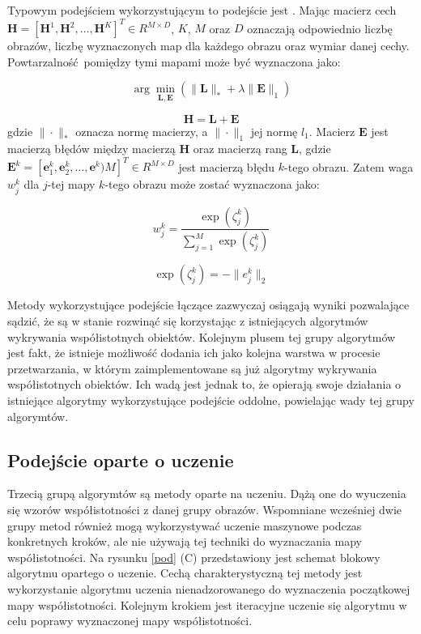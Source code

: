 \documentclass[a4paper,12pt,twoside,openany]{report}
\begin{document}
	Typowym podejściem wykorzystującym to podejście jest \cite{midfeatex}. Mając macierz cech $\mathbf{H} = [\mathbf{H}^1, \mathbf{H}^2, \dots, \mathbf{H}^K]^T \in R^{M \times D}$, $K$, $M$ oraz $D$ oznaczają odpowiednio liczbę obrazów, liczbę wyznaczonych map dla każdego obrazu oraz wymiar danej cechy. Powtarzalność pomiędzy tymi mapami może być wyznaczona jako:

	\begin{equation}
		\arg\min_{\mathbf{L}, \mathbf{E}} \left(\|\mathbf{L}\|_* + \lambda\|\mathbf{E}\|_1\right)
	\end{equation}

	\begin{equation}
	\mathbf{H} = \mathbf{L} + \mathbf{E}
	\end{equation}
	gdzie $\|\cdot\|_*$ oznacza normę macierzy, a $\|\cdot\|_1$ jej normę $l_1$. Macierz $\mathbf{E}$ jest macierzą błędów między macierzą $\mathbf{H}$ oraz macierzą rang $\mathbf{L}$, gdzie $\mathbf{E}^k=[\mathbf{e}^k_1, \mathbf{e}^k_2, \dots, \mathbf{e}^k)M]^T \in R^{M \times D}$ jest macierzą błędu $k$-tego obrazu. Zatem waga $w^k_j$ dla $j$-tej mapy $k$-tego obrazu może zostać wyznaczona jako:

	\begin{equation}
	w^k_j = \frac{\exp(\zeta^k_j)}{\sum^M_{j=1}\exp(\zeta^k_j)}
	\end{equation}


	\begin{equation}
		\exp(\zeta^k_j) = -\|e^k_j\|_2
	\end{equation}
	
	Metody wykorzystujące podejście łączące zazwyczaj osiągają wyniki pozwalające sądzić, że są w stanie rozwinąć się korzystając z istniejących algorytmów wykrywania współistotnych obiektów. Kolejnym plusem tej grupy algorytmów jest fakt, że istnieje możliwość dodania ich jako kolejna warstwa w procesie przetwarzania, w którym zaimplementowane są już algorytmy wykrywania współistotnych obiektów. Ich wadą jest jednak to, że opierają swoje działania o istniejące algorytmy wykorzystujące podejście oddolne, powielając wady tej grupy algorymtów.

	\subsection{Podejście oparte o uczenie}
	Trzecią grupą algorymtów są metody oparte na uczeniu. Dążą one do wyuczenia się wzorów współistotności z danej grupy obrazów. Wspomniane wcześniej dwie grupy metod również mogą wykorzystywać uczenie maszynowe podczas konkretnych kroków, ale nie używają tej techniki do wyznaczania mapy współistotności. Na rysunku \ref{pod} (C) przedstawiony jest schemat blokowy algorytmu opartego o uczenie. Cechą charakterystyczną tej metody jest wykorzystanie algorytmu uczenia nienadzorowanego do wyznaczenia początkowej mapy współistotności. Kolejnym krokiem jest iteracyjne uczenie się algorytmu w celu poprawy wyznaczonej mapy współistotności.
\end{document}
